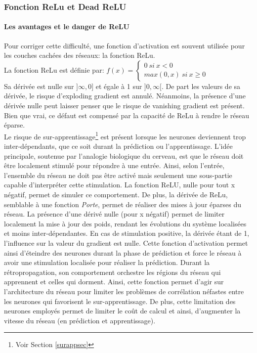 \subsubsection{Fonction ReLu et Dead ReLU}
\label{dead_relu}
\paragraph{Les avantages et le danger de ReLU}
\noindent Pour corriger cette difficulté, une fonction d'activation est souvent utilisée pour les couches cachées des réseaux: la fonction ReLu.\\

\noindent La fonction ReLu est définie par: $f(x)=\left\{\begin{array}{ll}0 \ si \ x<0 \\max(0,x) \ si \ x\geq 0\end{array}\right.$\\

\noindent Sa dérivée est nulle sur $]\infty,0]$ et égale à 1 sur $]0,\infty[$. De part les valeurs de sa dérivée, le risque d'exploding gradient est annulé. Néanmoins, la présence d'une dérivée nulle peut laisser penser que le risque de vanishing gradient est présent. Bien que vrai, ce défaut est compensé par la capacité de ReLu à rendre le réseau éparse.\\

\noindent Le risque de sur-apprentissage\footnote{Voir Section \ref{surappsec}} est présent lorsque les neurones deviennent trop inter-dépendants, que ce soit durant la prédiction ou l'apprentissage. L'idée principale, soutenue par l'analogie biologique du cerveau, est que le réseau doit être localement stimulé pour répondre à une entrée. Ainsi, selon l'entrée, l'ensemble du réseau ne doit pas être activé mais seulement une sous-partie capable d'interpréter cette stimulation. La fonction ReLU, nulle pour tout x négatif, permet de simuler ce comportement. De plus, la dérivée de ReLu, semblable à une fonction \textit{Porte}, permet de réaliser des mises à jour éparses du réseau. La présence d'une dérivé nulle (pour x négatif) permet de limiter localement la mise à jour des poids, rendant les évolutions du système localisées et moins inter-dépendantes. En cas de stimulation positive, la dérivée étant de 1, l'influence sur la valeur du gradient est nulle. Cette fonction d'activation permet ainsi d'éteindre des neurones durant la phase de prédiction et force le réseau à avoir une stimulation localisée pour réaliser la prédiction. Durant la rétropropagation, son comportement orchestre les régions du réseau qui apprennent et celles qui dorment. Ainsi, cette fonction permet d'agir sur l'architecture du réseau pour limiter les problèmes de corrélation néfastes entre les neurones qui favorisent le sur-apprentissage. De plus, cette limitation des neurones employés permet de limiter le coût de calcul et ainsi, d'augmenter la vitesse du réseau (en prédiction et apprentissage).\\

